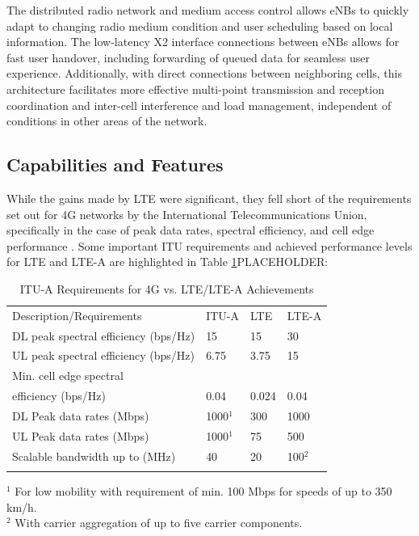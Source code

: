 The distributed radio network and medium access control allows eNBs to quickly adapt to changing radio medium condition and user scheduling based on local information.  The low-latency X2 interface connections between eNBs allows for fast user handover, including forwarding of queued data for seamless user experience.  Additionally, with direct connections between neighboring cells, this architecture facilitates more effective multi-point transmission and reception coordination and inter-cell interference and load management, independent of conditions in other areas of the network.  

\subsection{Capabilities and Features}

While the gains made by LTE were significant, they fell short of the requirements set out for 4G networks by the International Telecommunications Union, specifically in the case of peak data rates, spectral efficiency, and cell edge performance \cite{itu-advanced}. Some important ITU requirements and achieved performance levels for LTE and LTE-A are highlighted in Table \ref{perf-table}PLACEHOLDER:

\begin{table}
	\caption{ITU-A Requirements for 4G vs. LTE/LTE-A Achievements \cite{lte-3gpp}\cite{lteA-3gpp}\cite{itu-advanced}\cite{abdullah}}
	\label{perf-table}      
	\begin{tabular}{p{4.8cm}p{2.4cm}p{2.4cm}p{2.4cm}}
		\hline\noalign{\smallskip}
		Description/Requirements & ITU-A & LTE & LTE-A   \\
		\noalign{\smallskip}\svhline\noalign{\smallskip}
		DL peak spectral efficiency (bps/Hz) &  15   & 15  & 30 \\
		UL peak spectral efficiency (bps/Hz)& 6.75  & 3.75  & 15 \\
		Min. cell edge spectral \\ \hspace{0.8em} efficiency (bps/Hz) & 0.04 & 0.024 & 0.04 \\
		DL Peak data rates (Mbps) & 1000$^1$  & 300 & 1000 \\
		UL Peak data rates (Mbps) & 1000$^1$  & 75 & 500 \\
		Scalable bandwidth up to (MHz) & 40 & 20  & 100$^2$ \\
		
		\noalign{\smallskip}\hline\noalign{\smallskip}
	\end{tabular}
	$^1$ For low mobility with requirement of min. 100 Mbps for speeds of up to 350 km/h. 	 \\
	$^2$ With carrier aggregation of up to five carrier components.
\end{table}

